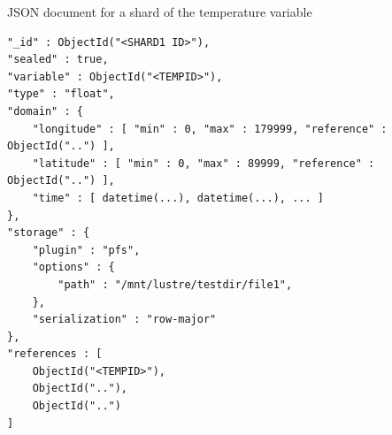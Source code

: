 \begin{tcbcode}[label={lst:mongotemperatureshard}]{JSON document for a shard of the temperature variable}
\begin{lstlisting}[upquote=true]
"_id" : ObjectId("<SHARD1 ID>"),
"sealed" : true,
"variable" : ObjectId("<TEMPID>"),
"type" : "float",
"domain" : {
	"longitude" : [ "min" : 0, "max" : 179999, "reference" : ObjectId("..") ],
	"latitude" : [ "min" : 0, "max" : 89999, "reference" : ObjectId("..") ],
	"time" : [ datetime(...), datetime(...), ... ]
},
"storage" : {
	"plugin" : "pfs",
	"options" : {
		"path" : "/mnt/lustre/testdir/file1",
	},
	"serialization" : "row-major"
},
"references : [
	ObjectId("<TEMPID>"),
	ObjectId(".."),
	ObjectId("..")
]
\end{lstlisting}
\end{tcbcode}

